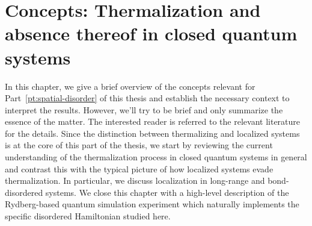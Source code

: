 \chapter{Concepts: Thermalization and absence thereof in closed quantum systems}\label{ch:concepts-thermalization}




In this chapter, we give a brief overview of the concepts relevant for Part~\ref{pt:spatial-disorder} of this thesis and establish the necessary context to interpret the results. However, we'll try to be brief and only summarize the essence of the matter. The interested reader is referred to the relevant literature for the details.
Since the distinction between thermalizing and localized systems is at the core of this part of the thesis, we start by reviewing the current understanding of the thermalization process in closed quantum systems in general and contrast this with the typical picture of how localized systems evade thermalization. In particular, we discuss localization in long-range and bond-disordered systems. We close this chapter with a high-level description of the Rydberg-based quantum simulation experiment which naturally implements the specific disordered Hamiltonian studied here.


